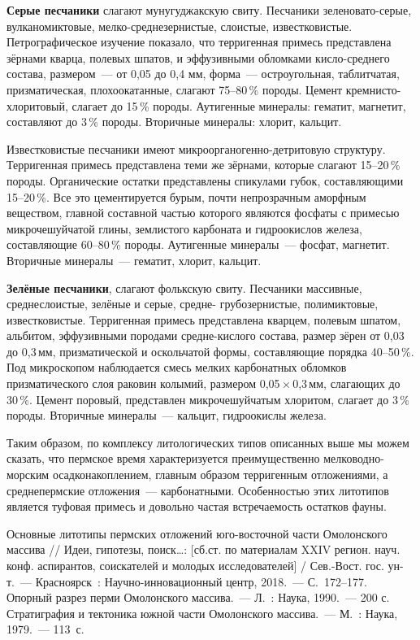 \textbf{Серые песчаники} слагают мунугуджакскую свиту. Песчаники зе\-ле\-но\-ва\-то-серые, вулканомиктовые, мелко-среднезернистые, слоистые, известковистые. Петрографическое изучение показало, что терригенная примесь представлена зёрнами кварца, полевых шпатов, и эффузивными обломками кисло-среднего состава, размером~--- от 0,05 до 0,4 мм, форма~--- остроугольная, таблитчатая, призматическая, плохоокатанные, слагают 75--80\,\% породы. Цемент кремнисто-хлоритовый, слагает до 15\,\% породы. Аутигенные минералы: гематит, магнетит, составляют до 3\,\% породы. Вторичные минералы: хлорит, кальцит.

Известковистые песчаники имеют микроорганогенно-детритовую структуру. Терригенная примесь представлена теми же зёрнами, которые слагают 15--20\,\% породы. Органические остатки представлены спикулами губок, составляющими 15--20\,\%. Все это цементируется бурым, почти непрозрачным аморфным веществом, главной составной частью которого являются фосфаты с примесью микрочешуйчатой глины, землистого карбоната и гидроокислов железа, составляющие 60--80\,\% породы. Аутигенные минералы~--- фосфат, магнетит. Вторичные минералы~--- гематит, хлорит, кальцит.

\textbf{Зелёные песчаники}, слагают фолькскую свиту. Песчаники массивные, среднеслоистые, зелёные и серые, средне- грубозернистые, полимиктовые, известковистые. Терригенная примесь представлена кварцем, полевым шпатом, альбитом, эффузивными породами средне-кислого состава, размер зёрен от 0,03 до 0,3\,мм, призматической и оскольчатой формы, составляющие порядка 40--50\,\%. Под микроскопом наблюдается смесь мелких карбонатных обломков призматического слоя раковин колымий, размером 0,05\,$\times$\,0,3\,мм, слагающих до 30\,\%. Цемент поровый, представлен микрочешуйчатым хлоритом, слагает до 3\,\% породы. Вторичные минералы~--- кальцит, гидроокислы железа.

Таким образом, по комплексу литологических типов описанных выше мы можем сказать, что пермское время характеризуется преимущественно мелководно-морским осадконакоплением, главным образом терригенным отложениями, а среднепермские отложения~--- карбонатными. Особенностью этих литотипов является туфовая примесь и довольно частая встречаемость остатков фауны.

\begin{thebibliography}{99}
\bibitem{} Основные литотипы пермских отложений юго-восточной части Омолонского массива // Идеи, гипотезы, поиск…: [сб.ст. по материалам XXIV регион. науч. конф. аспирантов, соискателей и молодых исследователей] / Сев.-Вост. гос. ун-т.~--- Красноярск~: Научно-инновационный центр, 2018.~--- С.~172--177.
\bibitem{} Опорный разрез перми Омолонского массива.~--- Л.~: Наука, 1990.~--- 200 с.
\bibitem{} Стратиграфия и тектоника южной части Омолонского массива.~--- М.~: Наука, 1979.~--- 113~с.
\end{thebibliography}
